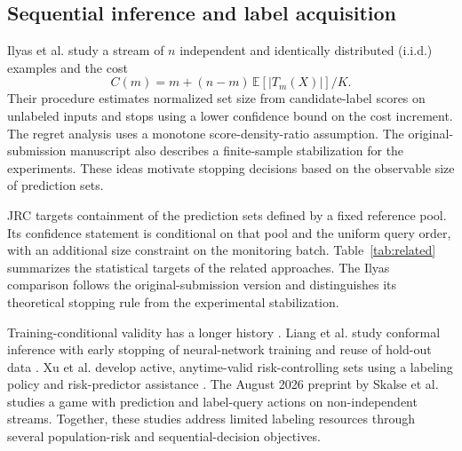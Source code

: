 \documentclass[preprint,12pt]{elsarticle}
\begin{document}
\subsection{Sequential inference and label acquisition}

Ilyas et al. \cite{ilyas} study a stream of $n$ independent and identically distributed (i.i.d.) examples and the cost
\begin{equation}
 C(m)=m+(n-m)\,\mathbb E[|T_m(X)|]/K.
 \label{eq:relatedcost}
\end{equation}
Their procedure estimates normalized set size from candidate-label scores on unlabeled inputs and stops using a lower confidence bound on the cost increment. The regret analysis uses a monotone score-density-ratio assumption. The original-submission manuscript also describes a finite-sample stabilization for the experiments. These ideas motivate stopping decisions based on the observable size of prediction sets.

JRC targets containment of the prediction sets defined by a fixed reference pool. Its confidence statement is conditional on that pool and the uniform query order, with an additional size constraint on the monitoring batch. Table~\ref{tab:related} summarizes the statistical targets of the related approaches. The Ilyas comparison follows the original-submission version and distinguishes its theoretical stopping rule from the experimental stabilization.

Training-conditional validity has a longer history \cite{vovk2012}. Liang et al. study conformal inference with early stopping of neural-network training and reuse of hold-out data \cite{liangstop}. Xu et al. develop active, anytime-valid risk-controlling sets using a labeling policy and risk-predictor assistance \cite{active2024}. The August 2026 preprint by Skalse et al.\ \cite{skalse2026} studies a game with prediction and label-query actions on non-independent streams. Together, these studies address limited labeling resources through several population-risk and sequential-decision objectives.
\end{document}
